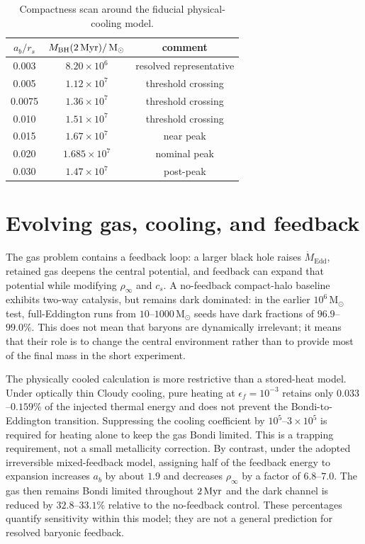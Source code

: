 \documentclass[11pt]{article}
\newcommand{\msun}{\,\mathrm{M}_{\odot}}
\newcommand{\Edd}{\mathrm{Edd}}
\begin{document}
\begin{table}[t]
\centering
\caption{Compactness scan around the fiducial physical-cooling model.}
\label{tab:compactness}
\begin{tabular}{ccc}
\toprule
$a_b/r_s$ & $M_{\rm BH}(2\,{\rm Myr})/\msun$ & comment\\
\midrule
0.003 & $8.20\times10^6$ & resolved representative\\
0.005 & $1.12\times10^7$ & threshold crossing\\
0.0075 & $1.36\times10^7$ & threshold crossing\\
0.010 & $1.51\times10^7$ & threshold crossing\\
0.015 & $1.67\times10^7$ & near peak\\
0.020 & $1.685\times10^7$ & nominal peak\\
0.030 & $1.47\times10^7$ & post-peak\\
\bottomrule
\end{tabular}
\end{table}

\section{Evolving gas, cooling, and feedback}
\label{sec:feedback}

The gas problem contains a feedback loop: a larger black hole raises $\dot M_{\Edd}$, retained gas deepens the central potential, and feedback can expand that potential while modifying $\rho_\infty$ and $c_s$.  A no-feedback compact-halo baseline exhibits two-way catalysis, but remains dark dominated: in the earlier $10^6\msun$ test, full-Eddington runs from $10$--$1000\msun$ seeds have dark fractions of $96.9$--$99.0\%$.  This does not mean that baryons are dynamically irrelevant; it means that their role is to change the central environment rather than to provide most of the final mass in the short experiment.

The physically cooled calculation is more restrictive than a stored-heat model.  Under optically thin Cloudy cooling, pure heating at $\epsilon_f=10^{-3}$ retains only $0.033$--$0.159\%$ of the injected thermal energy and does not prevent the Bondi-to-Eddington transition.  Suppressing the cooling coefficient by $10^5$--$3\times10^5$ is required for heating alone to keep the gas Bondi limited.  This is a trapping requirement, not a small metallicity correction.  By contrast, under the adopted irreversible mixed-feedback model, assigning half of the feedback energy to expansion increases $a_b$ by about $1.9$ and decreases $\rho_\infty$ by a factor of $6.8$--$7.0$.  The gas then remains Bondi limited throughout $2\,{\rm Myr}$ and the dark channel is reduced by $32.8$--$33.1\%$ relative to the no-feedback control.  These percentages quantify sensitivity within this model; they are not a general prediction for resolved baryonic feedback.
\end{document}
